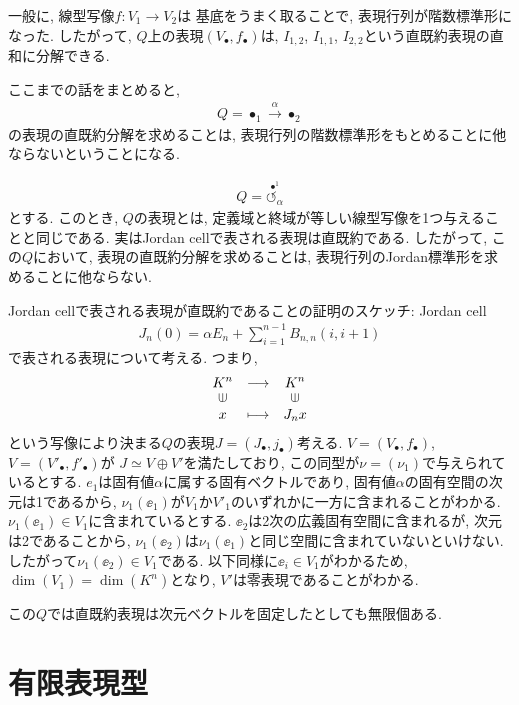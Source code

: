 \begin{example}
  一般に,
  線型写像$f\colon V_1\to V_2$は
  基底をうまく取ることで,
  表現行列が階数標準形になった.
  したがって,
  $Q$上の表現$(V_\bullet,f_\bullet)$は,
  $I_{1,2}$,
  $I_{1,1}$,
  $I_{2,2}$という直既約表現の直和に分解できる.

  ここまでの話をまとめると,
  \begin{align*}
    Q=\bullet_{1} \xrightarrow{\alpha} \bullet_{2}
  \end{align*}
  の表現の直既約分解を求めることは,
  表現行列の階数標準形をもとめることに他ならないということになる.  
\end{example}
\begin{example}
  \begin{align*}
    Q=\stackrel{\bullet^{1}}{\circlearrowleft_{\alpha}}
  \end{align*}
  とする.
  このとき, $Q$の表現とは,
  定義域と終域が等しい線型写像を1つ与えることと同じである.
  実はJordan cellで表される表現は直既約である.
  したがって, この$Q$において, 表現の直既約分解を求めることは,
  表現行列のJordan標準形を求めることに他ならない.

  Jordan cellで表される表現が直既約であることの証明のスケッチ:
  Jordan cell
  \begin{align*}
    J_n(0)=\alpha E_n+\sum_{i=1}^{n-1}B_{n,n}(i,i+1)
  \end{align*}
  で表される表現について考える.
  つまり,
  \begin{align*}
    \Shazo{K^n}{K^n}{x}{J_nx}
  \end{align*}
  という写像により決まる$Q$の表現$J=(J_\bullet, j_\bullet)$考える.
  $V=(V_\bullet,f_\bullet)$,
  $V=(V'_\bullet,f'_\bullet)$が
  $J\simeq V\oplus V'$を満たしており,
  この同型が$\nu=(\nu_1)$で与えられているとする.
  $e_1$は固有値$\alpha$に属する固有ベクトルであり,
  固有値$\alpha$の固有空間の次元は1であるから,
  $\nu_1(\ee_1)$が$V_1$か$V'_1$のいずれかに一方に含まれることがわかる.
  $\nu_1(\ee_1)\in V_1$に含まれているとする.
  $\ee_2$は2次の広義固有空間に含まれるが,
  次元は2であることから,
  $\nu_1(\ee_2)$は$\nu_1(\ee_1)$と同じ空間に含まれていないといけない.
  したがって$\nu_1(\ee_2)\in V_1$である.
  以下同様に$\ee_i\in V_1$がわかるため,
  $\dim(V_1)=\dim(K^n)$となり, $V'$は零表現であることがわかる.  

  この$Q$では直既約表現は次元ベクトルを固定したとしても無限個ある.
\end{example}


\section{有限表現型}

